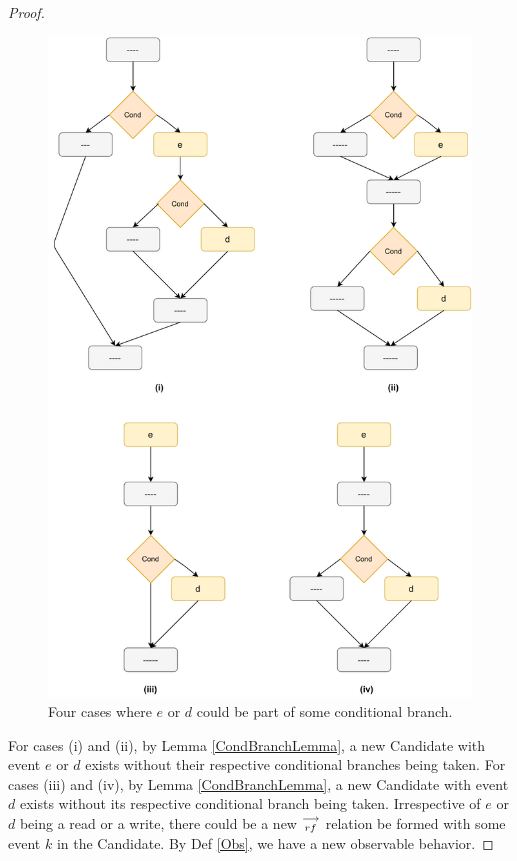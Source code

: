\begin{proof}
            \begin{figure}[H]
                \label{CondCases}
                \centering 
                \includegraphics[scale=0.5]{5.InstructionReordering/5.ValidReorderingProgram/ConditionalCases.pdf}
                \caption{Four cases where $e$ or $d$ could be part of some conditional branch.}
            \end{figure}

            For cases (i) and (ii), by Lemma \ref{CondBranchLemma}, a new Candidate with event $e$ or $d$ exists without their respective conditional branches being taken.
            For cases (iii) and (iv), by Lemma \ref{CondBranchLemma}, a new Candidate with event $d$ exists without its respective conditional branch being taken.
            Irrespective of $e$ or $d$ being a read or a write, there could be a new $\stackrel{\longrightarrow}{_{rf}}$ relation be formed with some event $k$ in the Candidate. By Def \ref{Obs}, we have a new observable behavior\footnotemark. 


\end{proof}
